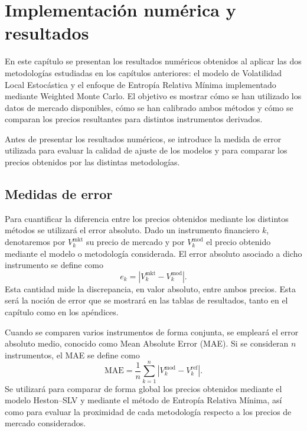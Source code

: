 \chapter{Implementación numérica y resultados}

En este capítulo se presentan los resultados numéricos obtenidos al aplicar las dos metodologías estudiadas en los capítulos anteriores: el modelo de Volatilidad Local Estocástica y el enfoque de Entropía Relativa Mínima implementado mediante Weighted Monte Carlo. El objetivo es mostrar cómo se han utilizado los datos de mercado disponibles, cómo se han calibrado ambos métodos y cómo se comparan los precios resultantes para distintos instrumentos derivados.\medskip

Antes de presentar los resultados numéricos, se introduce la medida de error utilizada para evaluar la calidad de ajuste de los modelos y para comparar los precios obtenidos por las distintas metodologías. 

\section{Medidas de error} 

Para cuantificar la diferencia entre los precios obtenidos mediante los distintos métodos se utilizará el error absoluto. Dado un instrumento financiero $k$, denotaremos por $V_k^{\mathrm{mkt}}$ su precio de mercado y por $V_k^{\mathrm{mod}}$ el precio obtenido mediante el modelo o metodología considerada. El error absoluto asociado a dicho instrumento se define como 
\begin{equation} 
e_k = \left| V_k^{\mathrm{mkt}} - V_k^{\mathrm{mod}} \right|. \label{eq:error_absoluto} 
\end{equation}
Esta cantidad mide la discrepancia, en valor absoluto, entre ambos precios. Esta será la noción de error que se mostrará en las tablas de resultados, tanto en el capítulo como en los apéndices. 

Cuando se comparen varios instrumentos de forma conjunta, se empleará el error absoluto medio, conocido como Mean Absolute Error (MAE). Si se consideran $n$ instrumentos, el MAE se define como 
\begin{equation} 
\mathrm{MAE} = \frac{1}{n} \sum_{k=1}^{n} \left| V_k^{\mathrm{mod}} - V_k^{\mathrm{ref}} \right|. \label{eq:mae} \end{equation}
Se utilizará para comparar de forma global los precios obtenidos mediante el modelo Heston--SLV y mediante el método de Entropía Relativa Mínima, así como para evaluar la proximidad de cada metodología respecto a los precios de mercado considerados.

